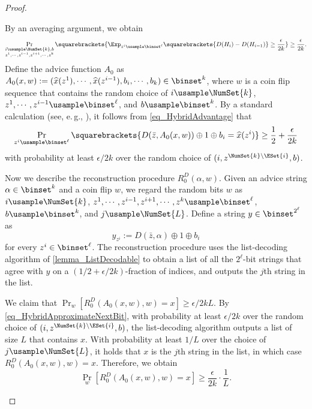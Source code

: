 \documentclass[11pt]{article}
\numberwithin{equation}{section}
\theoremstyle{definition}
\theoremstyle{plain}
\newcommand{\eg}{e.\,g.}
\begin{document}
\begin{proof}
\begin{claimproof}
    By an averaging argument,
    we obtain
    \begin{equation}
      \label{eq_HybridAdvantage}
      \Pr_{\substack{i \usample \NumSet{k}, b \\ z^1, \cdots, z^{i-1}, z^{i+1}, \cdots, z^k}} \squarebrackets {
        \Exp_{z^i \usample \binset^{\ell}} \squarebrackets{
          D(H_i) - D(H_{i-1})
        }
        \ge \frac{\epsilon}{2 k}
      }
      \ge \frac{\epsilon}{2 k}.
    \end{equation}
    Define the advice function $A_0$ as
    $A_0(x, w) := (\widehat{x}(z^1), \cdots, \widehat{x}(z^{i-1}), b_i, \cdots, b_k) \in \binset^k$,
    where $w$ is a coin flip sequence that contains
    the random choice of
    $i \usample \NumSet{k}$, $z^1, \cdots, z^{i-1} \usample \binset^{\ell}$, and $b \usample \binset^k$.
    By a standard calculation (see, \eg, \cite[Proposition 7.16]{Vadhan12_fttcs_journals}),
    it follows from \cref{eq_HybridAdvantage} that
    \begin{equation}
      \label{eq_HybridApproximateNextBit}
      \Pr_{z^i \usample \binset^\ell} \squarebrackets{ D(\bar{z}, A_0(x, w)) \oplus 1 \oplus b_i = \widehat{x}(z^i) } \ge \frac{1}{2} + \frac{\epsilon}{2 k }
    \end{equation}
    with probability at least $\epsilon / 2 k$ over the random choice of
    $(i, z^{\NumSet{k} \setminus \ESet{i}}, b)$.



    Now we describe the reconstruction procedure $R_0^D(\alpha, w)$.
    Given an advice string $\alpha \in \binset^k$ and a coin flip $w$,
    we regard the random bits $w$
    as $i \usample \NumSet{k}$, $z^1, \cdots, z^{i-1}, z^{i+1}, \cdots, z^k \usample \binset^{\ell}$, $b \usample \binset^k$, and $j \usample \NumSet{L}$.
    Define a string $y \in \binset^{2^\ell}$ as
    $$
      y_{z^i} :=
      D(\bar{z}, \alpha) \oplus 1 \oplus b_i
    $$
    for every $z^i \in \binset^\ell$.
    The reconstruction procedure uses the list-decoding algorithm of \cref{lemma_ListDecodable}
    to obtain a list of all the $2^\ell$-bit strings that agree with $y$ on a $(1/2 + \epsilon / 2k)$-fraction of indices,
    and outputs the $j$th string in the list.

    We claim that
    $\Pr_w [R_0^D(A_0(x, w), w) = x] \ge \epsilon / 2 k L$.
    By \cref{eq_HybridApproximateNextBit}, with probability at least $\epsilon / 2 k$ over the random choice of $(i, z^{\NumSet{k} \setminus \ESet{i}}, b)$,
    the list-decoding algorithm outputs a list of size $L$ that contains $x$.
    With probability at least $1 / L$ over the choice of $j \usample \NumSet{L}$,
    it holds that
    $x$ is the $j$th string in the list,
    in which case $R_0^D(A_0(x, w), w) = x$.
    Therefore, we obtain
    $$\Pr_w [R_0^D(A_0(x, w), w) = x] \ge \frac{\epsilon}{2 k} \cdot \frac{1}{L}.$$
  \end{claimproof}


\end{proof}
\end{document}
